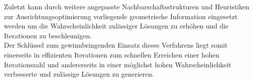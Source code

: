 \documentclass[12pt,a4paper,twoside]{article}
\theoremstyle{definition}
\numberwithin{equation}{section}
\begin{document}
Zuletzt kann durch weitere angepasste Nachbarschaftsstrukturen und Heuristiken zur Ausrichtungsoptimierung vorliegende geometrische Information eingesetzt werden um die Wahrscheinlichkeit zulässiger Lösungen zu erhöhen und die Iterationen zu beschleunigen.\\

Der Schlüssel zum gewinnbringenden Einsatz dieses  Verfahrens liegt somit einerseits in effizienten Iterationen zum schnellen Erreichen einer hohen Iterationszahl und andererseits in einer möglichst hohen Wahrscheinlichkeit verbesserte und zulässige Lösungen zu generieren.

\newpage

\listoffigures
{}
\newpage
\listoftables
{}
\newpage
\renewcommand\refname{Literaturverzeichnis}
 

\end{document}
